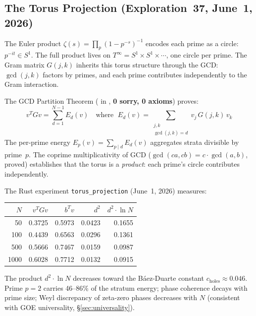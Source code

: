 \documentclass[11pt,a4paper]{article}
\begin{document}
\subsection{The Torus Projection (Exploration~37, June~1, 2026)}
\label{sec:torus-projection}

The Euler product $\zeta(s) = \prod_p (1-p^{-s})^{-1}$ encodes each
prime as a circle: $p^{-it} \in S^1$. The full product lives on
$T^\infty = S^1 \times S^1 \times \cdots$, one circle per prime.
The Gram matrix $G(j,k)$ inherits this torus structure through the
GCD: $\gcd(j,k)$ factors by primes, and each prime contributes
independently to the Gram interaction.

\begin{correspondence}
The GCD Partition Theorem (
in , \textbf{0 sorry, 0 axioms}) proves:
\[
  v^T G v = \sum_{d=1}^{N-1} E_d(v)
  \quad\text{where }\;
  E_d(v) = \sum_{\substack{j,k \\ \gcd(j,k)=d}} v_j \, G(j,k) \, v_k
\]
The per-prime energy $E_p(v) = \sum_{p \mid d} E_d(v)$ aggregates
strata divisible by prime~$p$. The coprime multiplicativity of GCD
($\gcd(ca,cb) = c \cdot \gcd(a,b)$, proved) establishes that the
torus is a \emph{product}: each prime's circle contributes independently.

The Rust experiment \texttt{torus\_projection} (June~1, 2026) measures:
\begin{center}
\small
\begin{tabular}{@{}rrrrr@{}}
\toprule
$N$ & $v^T G v$ & $b^T v$ & $d^2$ & $d^2 \cdot \ln N$ \\
\midrule
50 & 0.3725 & 0.5973 & 0.0423 & 0.1655 \\
100 & 0.4439 & 0.6563 & 0.0296 & 0.1361 \\
500 & 0.5666 & 0.7467 & 0.0159 & 0.0987 \\
1000 & 0.6028 & 0.7712 & 0.0132 & 0.0915 \\
\bottomrule
\end{tabular}
\end{center}
The product $d^2 \cdot \ln N$ decreases toward the B\'aez-Duarte
constant $c_{\mathrm{holes}} \approx 0.046$.
Prime $p=2$ carries 46--86\% of the stratum energy;
phase coherence decays with prime size;
Weyl discrepancy of zeta-zero phases decreases with $N$
(consistent with GOE universality, \S\ref{sec:universality}).
\end{correspondence}
\end{document}
